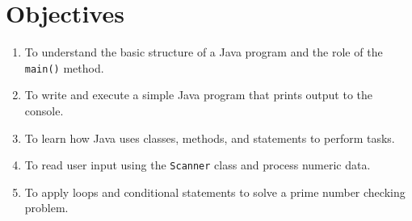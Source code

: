 \section{Objectives}
\begin{enumerate}
  \item To understand the basic structure of a Java program and the role of the \texttt{main()} method.
  \item To write and execute a simple Java program that prints output to the console.
  \item To learn how Java uses classes, methods, and statements to perform tasks.
  \item To read user input using the \texttt{Scanner} class and process numeric data.
  \item To apply loops and conditional statements to solve a prime number checking problem.
\end{enumerate}
